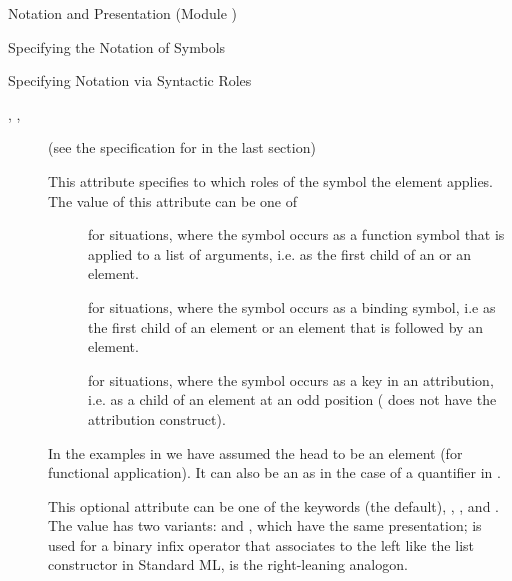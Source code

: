 \begin{tchapter}[id=pres,short=Notation and Presentation]{Notation and Presentation (Module {})}
\begin{tsection}[id=presentation,short=Notation of Symbols]{Specifying the Notation of Symbols}
\begin{tsubsection}[id=pres-declarative]{Specifying Notation via Syntactic Roles}
\begin{description}
\item[{}, {},
  {}] (see the specification for {} in the
  last section)
\item[{}] This attribute specifies to which roles of
  the symbol the {} element applies. The value of this
  attribute can be one of
  \begin{description}
  \item[{}] for situations, where the symbol
    occurs as a function symbol that is applied to a list of arguments, i.e. as
    the first child of an {} or an {} element.
  \item[{}] for situations, where the symbol
    occurs as a binding symbol, i.e as the first child of an {}
    element or an {} element that is followed by an
    {} element.
  \item[{}] for situations, where the symbol occurs as a
    key in an attribution, i.e. as a child of an {} element at
    an odd position ({\cmathml} does not have the attribution construct).
  \end{description}
In the examples in {} we have assumed the head to be an
{} element (for functional application). It can also be an
{} as in the case of a quantifier in
{}.
\item[{}] This optional attribute can be one of the
  keywords {} (the default),
  {}, {}, and
  {}. The value {}
  has two variants: {} and
  {}, which have the same presentation;
  {} is used for a binary infix operator that
  associates to the left like the list constructor in Standard ML,
  {} is the right-leaning analogon. 


\end{description}
\end{tsubsection}
\end{tsection}
\end{tchapter}
